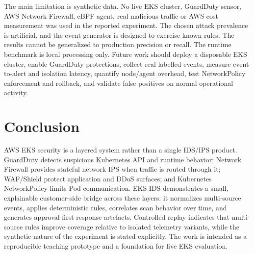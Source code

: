 \documentclass[conference]{IEEEtran}
\begin{document}
The main limitation is synthetic data. No live EKS cluster, GuardDuty sensor, AWS Network Firewall, eBPF agent, real malicious traffic or AWS cost measurement was used in the reported experiment. The chosen attack prevalence is artificial, and the event generator is designed to exercise known rules. The results cannot be generalized to production precision or recall. The runtime benchmark is local processing only. Future work should deploy a disposable EKS cluster, enable GuardDuty protections, collect real labelled events, measure event-to-alert and isolation latency, quantify node/agent overhead, test NetworkPolicy enforcement and rollback, and validate false positives on normal operational activity.

\section{Conclusion}
AWS EKS security is a layered system rather than a single IDS/IPS product. GuardDuty detects suspicious Kubernetes API and runtime behavior; Network Firewall provides stateful network IPS when traffic is routed through it; WAF/Shield protect application and DDoS surfaces; and Kubernetes NetworkPolicy limits Pod communication. EKS-IDS demonstrates a small, explainable customer-side bridge across these layers: it normalizes multi-source events, applies deterministic rules, correlates scan behavior over time, and generates approval-first response artefacts. Controlled replay indicates that multi-source rules improve coverage relative to isolated telemetry variants, while the synthetic nature of the experiment is stated explicitly. The work is intended as a reproducible teaching prototype and a foundation for live EKS evaluation.
\end{document}
